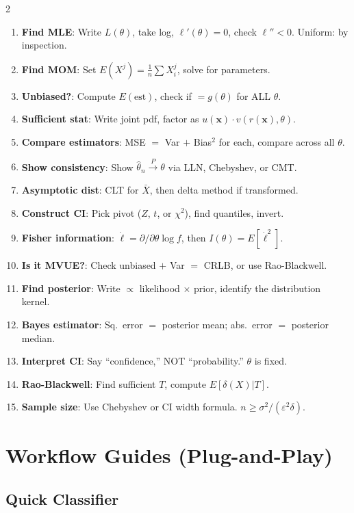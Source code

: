 \documentclass[8pt]{extarticle}
\begin{document}
\begin{multicols}{2}
\begin{enumerate}
\item \textbf{Find MLE}: Write $L(\theta)$, take log, $\ell'(\theta)=0$, check $\ell''<0$. Uniform: by inspection.
\item \textbf{Find MOM}: Set $E(X^j) = \frac{1}{n}\sum X_i^j$, solve for parameters.
\item \textbf{Unbiased?}: Compute $E(\text{est})$, check if $= g(\theta)$ for ALL $\theta$.
\item \textbf{Sufficient stat}: Write joint pdf, factor as $u(\mathbf{x})\cdot v(r(\mathbf{x}),\theta)$.
\item \textbf{Compare estimators}: MSE $=$ Var $+$ Bias$^2$ for each, compare across all $\theta$.
\item \textbf{Show consistency}: Show $\hat\theta_n \xrightarrow{P} \theta$ via LLN, Chebyshev, or CMT.
\item \textbf{Asymptotic dist}: CLT for $\bar X$, then delta method if transformed.
\item \textbf{Construct CI}: Pick pivot ($Z$, $t$, or $\chi^2$), find quantiles, invert.
\item \textbf{Fisher information}: $\dot\ell = \partial/\partial\theta \log f$, then $I(\theta) = E[\dot\ell^2]$.
\item \textbf{Is it MVUE?}: Check unbiased $+$ Var $=$ CRLB, or use Rao-Blackwell.
\item \textbf{Find posterior}: Write $\propto$ likelihood $\times$ prior, identify the distribution kernel.
\item \textbf{Bayes estimator}: Sq.\ error $=$ posterior mean; abs.\ error $=$ posterior median.
\item \textbf{Interpret CI}: Say ``confidence,'' NOT ``probability.'' $\theta$ is fixed.
\item \textbf{Rao-Blackwell}: Find sufficient $T$, compute $E[\delta(X)|T]$.
\item \textbf{Sample size}: Use Chebyshev or CI width formula. $n \ge \sigma^2/(\varepsilon^2\delta)$.
\end{enumerate}

\section{Workflow Guides (Plug-and-Play)}

\subsection{Quick Classifier}


\end{multicols}
\end{document}
